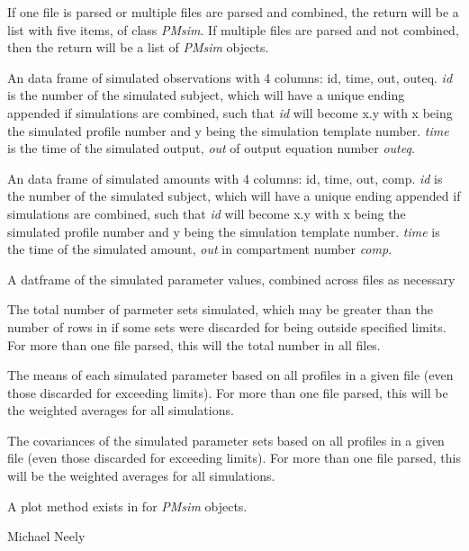 \documentclass[a4paper]{book}
\begin{document}
%
\begin{Value}
If one file is parsed or multiple files are parsed and combined, the return will be a list with five items, of class \emph{PMsim}.
If multiple files are parsed and not combined, then the return will be a list of \emph{PMsim} objects.
\begin{ldescription}
\item[\code{obs }] An data frame of simulated observations with 4 columns: id, time, out, outeq.
\emph{id} is the number of the simulated subject, which will have a unique ending appended
if simulations are combined, such that \emph{id} will become x.y with x being the simulated profile
number and y being the simulation template number.  \emph{time} is the time of the simulated
output, \emph{out} of output equation number \emph{outeq}.
\item[\code{amt }] An data frame of simulated amounts with 4 columns: id, time, out, comp.
\emph{id} is the number of the simulated subject, which will have a unique ending appended
if simulations are combined, such that \emph{id} will become x.y with x being the simulated profile
number and y being the simulation template number.  \emph{time} is the time of the simulated
amount, \emph{out} in compartment  number \emph{comp}.
\item[\code{parValues }] A datframe of the simulated parameter values, combined across files as necessary
\item[\code{totalSets}] The total number of parmeter sets simulated, which may be greater than the number of rows in  if some sets
were discarded for being outside specified limits.  For more than one file parsed, this will the total number in all files.
\item[\code{totalMeans}] The means of each simulated parameter based on all profiles in a given file (even those discarded for exceeding limits).
For more than one file parsed, this will be the weighted averages for all simulations.
\item[\code{totalCov}] The covariances of the simulated parameter sets based on all profiles in a given file (even those discarded for exceeding limits).
For more than one file parsed, this will be the weighted averages for all simulations.
\end{ldescription}
A plot method exists in  for \emph{PMsim} objects.
\end{Value}
%
\begin{Author}\relax
Michael Neely
\end{Author}
\end{document}
